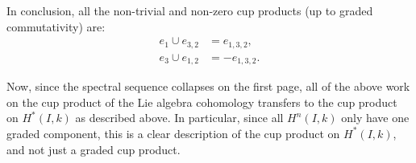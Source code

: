 In conclusion, all the non-trivial and non-zero cup products (up to graded commutativity) are:
\begin{equation}
  \label{eq:cup-products-SL2}
  \begin{aligned}
    e_{1} \cup e_{3,2} &= e_{1,3,2}, \\
    e_{3} \cup e_{1,2} &= -e_{1,3,2}.
  \end{aligned}
\end{equation}

Now, since the spectral sequence collapses on the first page, all of the above work on the cup product of the Lie algebra cohomology transfers to the cup product on $H^{*}(I,k)$ as described above. In particular, since all $H^{n}(I,k)$ only have one graded component, this is a clear description of the cup product on $H^{*}(I,k)$, and not just a graded cup product.

